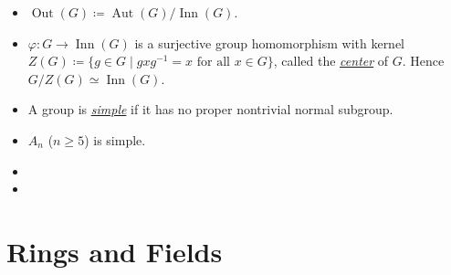 \documentclass{article}
\newcommand{\df}[1]{\ul{\textit{#1}}}
\newcommand{\aut}{\operatorname{Aut}}
\newcommand{\inn}{\operatorname{Inn}}
\renewcommand{\phi}{\varphi}
\begin{document}
\begin{itemize}
    \item $\operatorname{Out}(G) \coloneqq \aut(G)/\inn(G)$.
    \item $\phi: G \to \inn(G)$ is a surjective group homomorphism with kernel $Z(G) \coloneqq \{g \in G \mid g x g^{-1} = x \text{ for all } x \in G\}$, called the \df{center} of $G$. Hence $G/Z(G) \simeq \inn(G)$.
    \item A group is \df{simple} if it has no proper nontrivial normal subgroup.
    \item $A_n$ ($n \geq 5$) is simple.
    \item
    \item 
\end{itemize}

\section{Rings and Fields}
\end{document}

